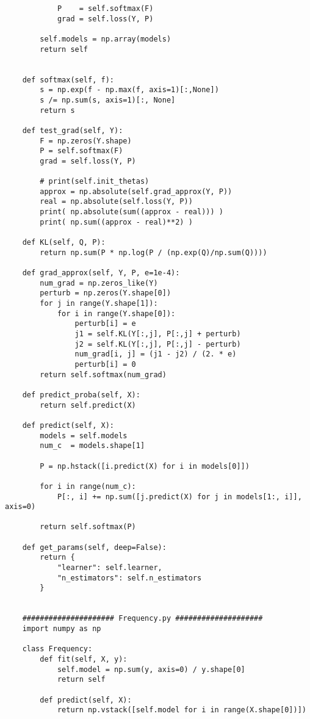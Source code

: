 \documentclass[a4paper,11pt]{article}
\begin{document}
\begin{lstlisting}
            P    = self.softmax(F)
            grad = self.loss(Y, P)

        self.models = np.array(models)
        return self


    def softmax(self, f):
        s = np.exp(f - np.max(f, axis=1)[:,None])
        s /= np.sum(s, axis=1)[:, None]
        return s

    def test_grad(self, Y):
        F = np.zeros(Y.shape)
        P = self.softmax(F)
        grad = self.loss(Y, P)

        # print(self.init_thetas)
        approx = np.absolute(self.grad_approx(Y, P))
        real = np.absolute(self.loss(Y, P))
        print( np.absolute(sum((approx - real))) )
        print( np.sum((approx - real)**2) )

    def KL(self, Q, P):
        return np.sum(P * np.log(P / (np.exp(Q)/np.sum(Q))))

    def grad_approx(self, Y, P, e=1e-4):
        num_grad = np.zeros_like(Y)
        perturb = np.zeros(Y.shape[0])
        for j in range(Y.shape[1]):
            for i in range(Y.shape[0]):
                perturb[i] = e
                j1 = self.KL(Y[:,j], P[:,j] + perturb)
                j2 = self.KL(Y[:,j], P[:,j] - perturb)
                num_grad[i, j] = (j1 - j2) / (2. * e)
                perturb[i] = 0
        return self.softmax(num_grad)

    def predict_proba(self, X):
        return self.predict(X)

    def predict(self, X):
        models = self.models
        num_c  = models.shape[1]

        P = np.hstack([i.predict(X) for i in models[0]])

        for i in range(num_c):
            P[:, i] += np.sum([j.predict(X) for j in models[1:, i]], axis=0)

        return self.softmax(P)

    def get_params(self, deep=False):
        return {
            "learner": self.learner,
            "n_estimators": self.n_estimators
        }


    ##################### Frequency.py ####################
    import numpy as np

    class Frequency:
        def fit(self, X, y):
            self.model = np.sum(y, axis=0) / y.shape[0]
            return self

        def predict(self, X):
            return np.vstack([self.model for i in range(X.shape[0])])


\end{lstlisting}
\end{document}
